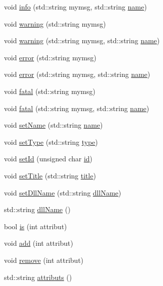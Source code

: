 \begin{DoxyCompactItemize}
void \hyperlink{classObject_a1ca123253dfd30fc28b156f521dcbdae}{info} (std\+::string mymsg, std\+::string \hyperlink{classObject_a300f4c05dd468c7bb8b3c968868443c1}{name})
\item 
void \hyperlink{classObject_a65cd4fda577711660821fd2cd5a3b4c9}{warning} (std\+::string mymsg)
\item 
void \hyperlink{classObject_a11f101db4dd73d9391b0231818881d86}{warning} (std\+::string mymsg, std\+::string \hyperlink{classObject_a300f4c05dd468c7bb8b3c968868443c1}{name})
\item 
void \hyperlink{classObject_a204a95f57818c0f811933917a30eff45}{error} (std\+::string mymsg)
\item 
void \hyperlink{classObject_ad7f6c457733082efa2f9ff5f5c8e119a}{error} (std\+::string mymsg, std\+::string \hyperlink{classObject_a300f4c05dd468c7bb8b3c968868443c1}{name})
\item 
void \hyperlink{classObject_aad5a16aac7516ce65bd5ec02ab07fc80}{fatal} (std\+::string mymsg)
\item 
void \hyperlink{classObject_ae62acd3d09f716220f75f252dc38bc9a}{fatal} (std\+::string mymsg, std\+::string \hyperlink{classObject_a300f4c05dd468c7bb8b3c968868443c1}{name})
\item 
void \hyperlink{classObject_ae30fea75683c2d149b6b6d17c09ecd0c}{set\+Name} (std\+::string \hyperlink{classObject_a300f4c05dd468c7bb8b3c968868443c1}{name})
\item 
void \hyperlink{classObject_aae534cc9d982bcb9b99fd505f2e103a5}{set\+Type} (std\+::string \hyperlink{classObject_a84f99f70f144a83e1582d1d0f84e4e62}{type})
\item 
void \hyperlink{classObject_a398fe08cba594a0ce6891d59fe4f159f}{set\+Id} (unsigned char \hyperlink{classObject_af99145335cc61ff6e2798ea17db009d2}{id})
\item 
void \hyperlink{classObject_a89557dbbad5bcaa02652f5d7fa35d20f}{set\+Title} (std\+::string \hyperlink{classObject_a73a0f1a41828fdd8303dd662446fb6c3}{title})
\item 
void \hyperlink{classObject_a870c5af919958c2136623b2d7816d123}{set\+Dll\+Name} (std\+::string \hyperlink{classObject_a2e3947f2870094c332d7454117f3ec63}{dll\+Name})
\item 
std\+::string \hyperlink{classObject_a2e3947f2870094c332d7454117f3ec63}{dll\+Name} ()
\item 
bool \hyperlink{classAttrib_a704f26af560909ad22065083bb7d4c34}{is} (int attribut)
\item 
void \hyperlink{classAttrib_a235f773af19c900264a190b00a3b4ad7}{add} (int attribut)
\item 
void \hyperlink{classAttrib_a7d4ef7e32d93cb287792b87b857e79f3}{remove} (int attribut)
\item 
std\+::string \hyperlink{classAttrib_aee7bbf16b144887f196e1341b24f8a26}{attributs} ()
\end{DoxyCompactItemize}
